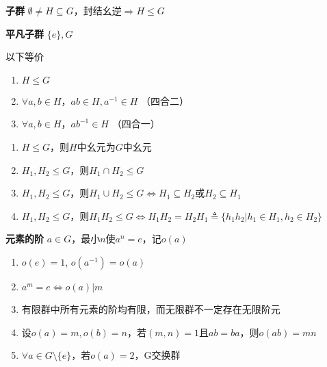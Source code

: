 \documentclass[a4paper,10pt]{ctexart}
\newcommand*{\impl}{\Rightarrow}
\renewcommand*{\iff}{\Leftrightarrow}
\renewcommand*{\leq}{\leqslant}
\begin{document}
\begin{multicols}{3}
    \textbf{子群} $\emptyset \!\neq\! H \!\subseteq\! G$，封结幺逆$\impl H \!\leq\! G$

    \textbf{平凡子群} $\{e\}, G$

    \begin{theorem}[子群判则]
        以下等价
        \begin{enumerate}
            \item $H \leq G$
            \item $\forall a, b \!\in\! H$，$ab \!\in\! H, a^{-1} \!\in\! H$ （四合二）
            \item $\forall a, b \!\in\! H$，$ab^{-1} \!\in\! H$ （四合一）
        \end{enumerate}
    \end{theorem}

    \begin{theorem}[子群运算律]
        \hfil

        \begin{enumerate}
            \item $H \!\leq\! G$，则$H$中幺元为$G$中幺元
            \item $H_1, H_2 \!\leq\! G$，则$H_1 \!\cap\! H_2 \!\leq\! G$
            \item $H_1, H_2 \!\leq\! G$，则$H_1 \!\cup\! H_2 \!\leq\! G \!\iff\! H_1 \!\subseteq\! H_2 $或$H_2 \!\subseteq\! H_1$
            \item $H_1, H_2 \!\leq\! G$，则$H_1 H_2 \!\leq\! G \!\iff\! H_1 H_2 = H_2 H_1 \!\triangleq\! \{h_1h_2 | h_1 \!\in\! H_1, h_2 \!\in\! H_2\}$
        \end{enumerate}
    \end{theorem}

    \textbf{元素的阶} $a \!\in\! G$，最小$n$使$a^n \!=\! e$，记$o(a)$

    \begin{theorem}[阶的性质]
        \hfil

        \begin{enumerate}
            \item $o(e) = 1$, $o(a^{-1}) = o(a)$
            \item $a^m = e \iff o(a) | m$
            \item 有限群中所有元素的阶均有限，而无限群不一定存在无限阶元
            \item 设$o(a) = m, o(b) = n$，若$(m, n) = 1$且$ab = ba$，则$o(ab) = mn$
            \item $\forall a \!\in\! G \!\setminus\! \{e\}$，若$o(a) = 2$，G交换群
        \end{enumerate}
    \end{theorem}


\end{multicols}
\end{document}
